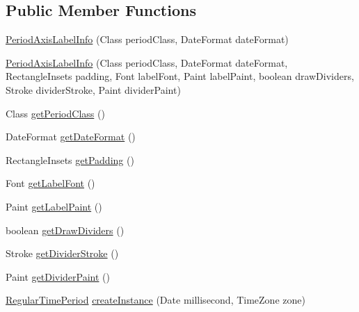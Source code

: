 \subsection*{Public Member Functions}
\begin{DoxyCompactItemize}
\item 
\mbox{\hyperlink{classorg_1_1jfree_1_1chart_1_1axis_1_1_period_axis_label_info_ad7a8342bb05ab92c09471fedb4af1ec0}{Period\+Axis\+Label\+Info}} (Class period\+Class, Date\+Format date\+Format)
\item 
\mbox{\hyperlink{classorg_1_1jfree_1_1chart_1_1axis_1_1_period_axis_label_info_a4f4e2bfc350f5ec8ff364c0a27720871}{Period\+Axis\+Label\+Info}} (Class period\+Class, Date\+Format date\+Format, Rectangle\+Insets padding, Font label\+Font, Paint label\+Paint, boolean draw\+Dividers, Stroke divider\+Stroke, Paint divider\+Paint)
\item 
Class \mbox{\hyperlink{classorg_1_1jfree_1_1chart_1_1axis_1_1_period_axis_label_info_ad562fc2e2faf628259ab1b4b4ed8f822}{get\+Period\+Class}} ()
\item 
Date\+Format \mbox{\hyperlink{classorg_1_1jfree_1_1chart_1_1axis_1_1_period_axis_label_info_a056ccef3cd3c323d795a82d35fd5282a}{get\+Date\+Format}} ()
\item 
Rectangle\+Insets \mbox{\hyperlink{classorg_1_1jfree_1_1chart_1_1axis_1_1_period_axis_label_info_aee0cdce1a2cd3a9ae179b48759285ad3}{get\+Padding}} ()
\item 
Font \mbox{\hyperlink{classorg_1_1jfree_1_1chart_1_1axis_1_1_period_axis_label_info_af800c6cce8831fee99ffe6d9940b0cbe}{get\+Label\+Font}} ()
\item 
Paint \mbox{\hyperlink{classorg_1_1jfree_1_1chart_1_1axis_1_1_period_axis_label_info_ac4edb4c0f9ea089babbf9e1535ee9e91}{get\+Label\+Paint}} ()
\item 
boolean \mbox{\hyperlink{classorg_1_1jfree_1_1chart_1_1axis_1_1_period_axis_label_info_a6be47d7c3a8630c1c51b13b2f39670b2}{get\+Draw\+Dividers}} ()
\item 
Stroke \mbox{\hyperlink{classorg_1_1jfree_1_1chart_1_1axis_1_1_period_axis_label_info_aa3e06a7a6b063555a5e5e96e436b196b}{get\+Divider\+Stroke}} ()
\item 
Paint \mbox{\hyperlink{classorg_1_1jfree_1_1chart_1_1axis_1_1_period_axis_label_info_acf437d935349f363261e457cb472150a}{get\+Divider\+Paint}} ()
\item 
\mbox{\hyperlink{classorg_1_1jfree_1_1data_1_1time_1_1_regular_time_period}{Regular\+Time\+Period}} \mbox{\hyperlink{classorg_1_1jfree_1_1chart_1_1axis_1_1_period_axis_label_info_aa9717dec9050479aafac980b803a3e4f}{create\+Instance}} (Date millisecond, Time\+Zone zone)

\end{DoxyCompactItemize}
